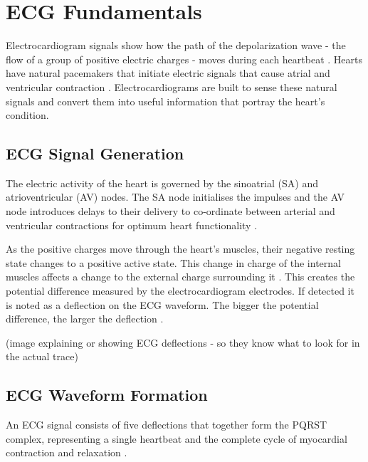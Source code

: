 
\section{ECG Fundamentals} \label{sec: ECG_Fund}

Electrocardiogram signals show how the path of the \gls{depolarization wave} - the flow of a group of positive electric charges - moves during each heartbeat \cite{osmosisECGbasics2025}. Hearts have natural pacemakers that initiate electric signals that cause atrial and ventricular contraction \cite{myhealthSAnode2024}. Electrocardiograms are built to sense these natural signals and convert them into useful information that portray the heart's condition.

\subsection{ECG Signal Generation}

The electric activity of the heart is governed by the sinoatrial (SA) and atrioventricular (AV) nodes. The SA node initialises the impulses and the AV node introduces delays to their delivery to co-ordinate between arterial and ventricular contractions for optimum heart functionality \cite{myhealthSAnode2024}.

As the positive charges move through the heart's muscles, their negative resting state changes to a positive active state. This change in charge of the internal muscles affects a change to the external charge surrounding it \cite{osmosisECGbasics2025}. This creates the potential difference measured by the electrocardiogram electrodes. If detected it is noted as a deflection on the ECG waveform. The bigger the potential difference, the larger the deflection \cite{osmosisECGbasics2025}.

(image explaining or showing ECG deflections - so they know what to look for in the actual trace)

\subsection{ECG Waveform Formation}

An ECG signal consists of five deflections that together form the PQRST complex, representing a single heartbeat and the complete cycle of myocardial contraction and relaxation \cite{AlGhatrif2012}.

